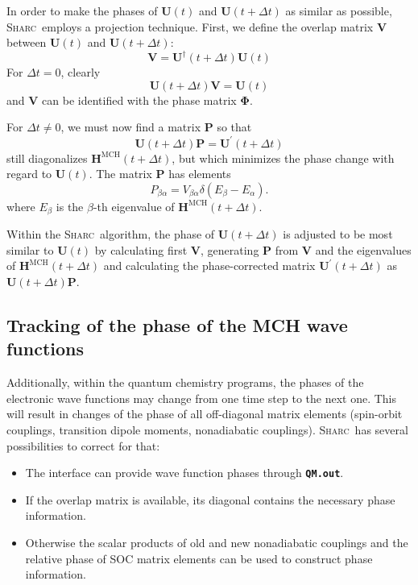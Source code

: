 \documentclass[a4paper,10pt,DIV=15,openany]{scrbook}
\newcommand{\sharc}{\textsc{Sharc}}
\newcommand{\ttt}[1]{\textbf{\texttt{#1}}}
\newcommand{\VEC}[1]{\ensuremath{\mathbf{#1}}}
\begin{document}
In order to make the phases of $\VEC{U}(t)$ and $\VEC{U}(t+\Delta t)$ as similar as possible, \sharc\ employs a projection technique. First, we define the overlap matrix $\VEC{V}$ between $\VEC{U}(t)$ and $\VEC{U}(t+\Delta t)$:
\begin{equation}
  \VEC{V}=\VEC{U}^\dagger(t+\Delta t)\VEC{U}(t)
\end{equation}
For $\Delta t=0$, clearly
\begin{equation}
  \VEC{U}(t+\Delta t)\VEC{V}=\VEC{U}(t)
\end{equation}
and $\VEC{V}$ can be identified with the phase matrix $\boldsymbol{\Phi}$.

For $\Delta t\neq 0$, we must now find a matrix $\VEC{P}$ so that
\begin{equation}
  \VEC{U}(t+\Delta t)\VEC{P}=\VEC{U}^\prime(t+\Delta t)
\end{equation}
still diagonalizes $\VEC{H}^{\text{MCH}}(t+\Delta t)$, but which minimizes the phase change with regard to $\VEC{U}(t)$.
The matrix $\VEC{P}$ has elements
\begin{equation}
  P_{\beta\alpha}=V_{\beta\alpha}
  \delta\left(
    E_\beta-E_\alpha
  \right).
\end{equation}
where $E_\beta$ is the $\beta$-th eigenvalue of $\VEC{H}^{\text{MCH}}(t+\Delta t)$.

Within the \sharc\ algorithm, the phase of $\VEC{U}(t+\Delta t)$ is adjusted to be most similar to $\VEC{U}(t)$ by calculating first $\VEC{V}$, generating $\VEC{P}$ from $\VEC{V}$ and the eigenvalues of $\VEC{H}^{\text{MCH}}(t+\Delta t)$ and calculating the phase-corrected matrix $\VEC{U}^\prime(t+\Delta t)$ as $\VEC{U}(t+\Delta t)\VEC{P}$.

\subsection{Tracking of the phase of the MCH wave functions}

Additionally, within the quantum chemistry programs, the phases of the electronic wave functions may change from one time step to the next one. This will result in changes of the phase of all off-diagonal matrix elements (spin-orbit couplings, transition dipole moments, nonadiabatic couplings). \sharc\ has several possibilities to correct for that:
\begin{itemize}
  \item The interface can provide wave function phases through \ttt{QM.out}.
  \item If the overlap matrix is available, its diagonal contains the necessary phase information.
  \item Otherwise the scalar products of old and new nonadiabatic couplings and the relative phase of SOC matrix elements can be used to construct phase information.
\end{itemize}
\end{document}
